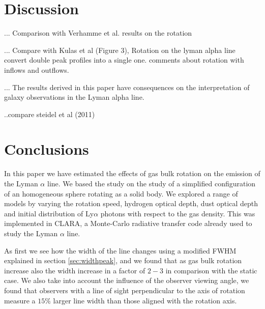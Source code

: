 \documentclass[usenatbib]{mn2e}
\begin{document}


\section{Discussion}
\label{sec:discussion}

... Comparison with Verhamme et al. results on the rotation


... Compare with Kulas et al (Figure 3), Rotation on the lyman alpha
line convert double peak profiles into a single one. comments about
rotation with inflows and outflows.   

... The results derived in this paper have consequences on the
interpretation of galaxy observations in the Lyman alpha line.

..compare steidel et al (2011) 





\section{Conclusions}
In this paper we have estimated the effects of gas bulk rotation on
the emission  of the Lyman $\alpha$ line. We based the study on the
study of a simplified configuration of an homogeneous sphere rotating
as a solid body. We explored  a range of models by varying the
rotation speed, hydrogen optical depth, dust optical depth and initial
distribution of Ly$\alpha$ photons with respect to the gas
density. This was implemented in CLARA, a Monte-Carlo
radiative transfer code already used to study the Lyman $\alpha$
line. 

As first we see how the width of the line changes using a modified FWHM
explained in section \ref{sec:widthpeak}, and we found that as gas bulk 
rotation increase also the width increase in a factor of $2-3$ in comparison 
with the static case. We also take into account the influence of the observer 
viewing angle, we found that observers with a line of sight perpendicular  
to the axis of rotation measure a $15\%$ larger line width than those 
aligned with the rotation axis.
\end{document}
